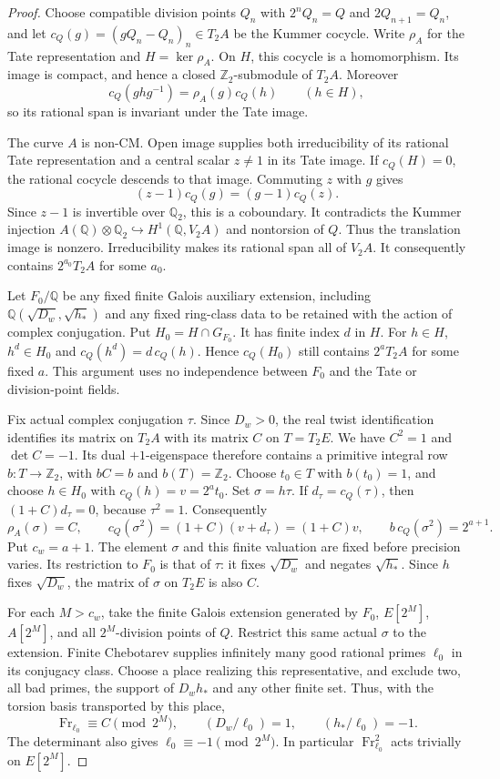\documentclass[11pt]{article}
\theoremstyle{definition}
\theoremstyle{remark}
\newcommand{\Q}{\mathbb Q}
\newcommand{\Z}{\mathbb Z}
\begin{document}
\begin{proof}
Choose compatible division points $Q_n$ with
$2^nQ_n=Q$ and $2Q_{n+1}=Q_n$, and let
$c_Q(g)=(gQ_n-Q_n)_n\in T_2A$ be the Kummer cocycle.
Write $\rho_A$ for the Tate representation and $H=\ker\rho_A$.
On $H$, this cocycle is a homomorphism. Its image is compact,
and hence a closed $\Z_2$-submodule of $T_2A$. Moreover
\[
 c_Q(ghg^{-1})=\rho_A(g)c_Q(h)\qquad(h\in H),
\]
so its rational span is invariant under the Tate image.

The curve $A$ is non-CM. Open image \cite{serre} supplies both
irreducibility of its rational Tate representation and a central
scalar $z\ne1$ in its Tate image. If $c_Q(H)=0$, the rational
cocycle descends to that image. Commuting $z$ with $g$ gives
\[
 (z-1)c_Q(g)=(g-1)c_Q(z).
\]
Since $z-1$ is invertible over $\Q_2$, this is a coboundary.
It contradicts the Kummer injection
$A(\Q)\otimes\Q_2\hookrightarrow H^1(\Q,V_2A)$ and
nontorsion of $Q$. Thus the translation image is nonzero.
Irreducibility makes its rational span all of $V_2A$.
It consequently contains $2^{a_0}T_2A$ for some $a_0$.

Let $F_0/\Q$ be any fixed finite Galois auxiliary extension,
including $\Q(\sqrt{D_w},\sqrt{h_*})$ and any fixed ring-class
data to be retained with the action of complex conjugation.
Put $H_0=H\cap G_{F_0}$. It has finite index $d$ in $H$.
For $h\in H$, $h^d\in H_0$ and
$c_Q(h^d)=d\,c_Q(h)$. Hence $c_Q(H_0)$ still contains
$2^aT_2A$ for some fixed $a$.
This argument uses no independence between $F_0$ and the Tate
or division-point fields.

Fix actual complex conjugation $\tau$. Since $D_w>0$, the real
twist identification identifies its matrix on $T_2A$ with its
matrix $C$ on $T=T_2E$. We have $C^2=1$ and $\det C=-1$.
Its dual $+1$-eigenspace therefore contains a primitive integral
row $b:T\to\Z_2$, with $bC=b$ and $b(T)=\Z_2$.
Choose $t_0\in T$ with $b(t_0)=1$, and choose $h\in H_0$ with
$c_Q(h)=v=2^at_0$. Set $\sigma=h\tau$. If $d_\tau=c_Q(\tau)$,
then $(1+C)d_\tau=0$, because $\tau^2=1$. Consequently
\[
 \rho_A(\sigma)=C,\qquad
 c_Q(\sigma^2)=(1+C)(v+d_\tau)=(1+C)v,\qquad
 b\,c_Q(\sigma^2)=2^{a+1}.
\]
Put $c_w=a+1$. The element $\sigma$ and this finite valuation
are fixed before precision varies. Its restriction to $F_0$
is that of $\tau$: it fixes $\sqrt{D_w}$ and negates
$\sqrt{h_*}$. Since $h$ fixes $\sqrt{D_w}$, the matrix of
$\sigma$ on $T_2E$ is also $C$.

For each $M>c_w$, take the finite Galois extension generated by
$F_0$, $E[2^M]$, $A[2^M]$, and all $2^M$-division points of $Q$.
Restrict this same actual $\sigma$ to the extension. Finite
Chebotarev supplies infinitely many good rational primes $\ell_0$
in its conjugacy class. Choose a place realizing this representative,
and exclude two, all bad primes, the support of $D_wh_*$ and any
other finite set. Thus, with the torsion basis transported by this
place,
\[
 \operatorname{Fr}_{\ell_0}\equiv C\pmod{2^M},\qquad
 (D_w/\ell_0)=1,\qquad(h_*/\ell_0)=-1.
\]
The determinant also gives $\ell_0\equiv-1\pmod{2^M}$.
In particular $\operatorname{Fr}_{\ell_0}^2$ acts trivially on
$E[2^M]$.


\end{proof}
\end{document}
